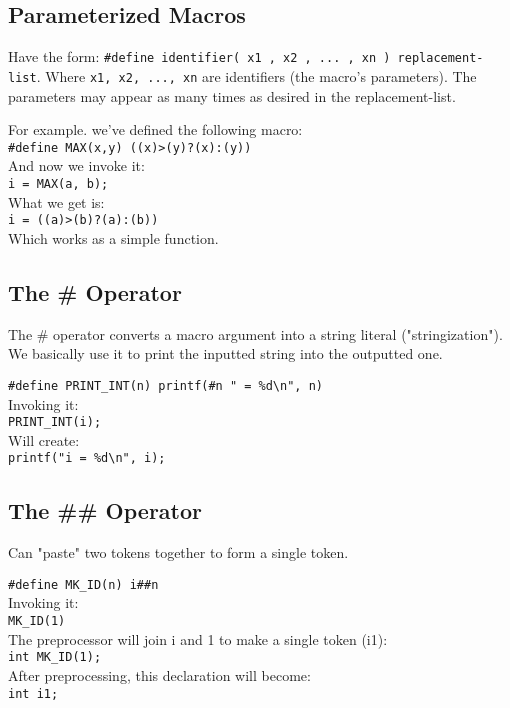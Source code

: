 \documentclass[openany]{book}
\begin{document}
    \subsection*{Parameterized Macros}

    Have the form: \texttt{\#define identifier( x1 , x2 , ... , xn ) replacement-list}. Where \texttt{x1, x2, ..., xn} are identifiers (the macro's parameters). The parameters may appear as many times as desired in the replacement-list.
    
    \bigskip

    For example. we've defined the following macro: \\
    \texttt{\#define MAX(x,y) ((x)>(y)?(x):(y))} \\
    And now we invoke it: \\
    \texttt{i = MAX(a, b);} \\
    What we get is: \\
    \texttt{i = ((a)>(b)?(a):(b))} \\
    Which works as a simple function.

    \subsection*{The \# Operator}

    The \# operator converts a macro argument into a string literal ("stringization"). We basically use it to print the inputted string into the outputted one.

    \bigskip

    \texttt{\#define PRINT\_INT(n) printf(\#n " = \%d\textbackslash n", n)} \\
    Invoking it: \\
    \texttt{PRINT\_INT(i);} \\
    Will create: \\
    \texttt{printf("i = \%d\textbackslash n", i);}

    \subsection*{The \#\# Operator}

    Can "paste" two tokens together to form a single token.

    \bigskip

    \texttt{\#define MK\_ID(n) i\#\#n} \\
    Invoking it: \\
    \texttt{MK\_ID(1)}\\
    The preprocessor will join i and 1 to make a single token (i1): \\
    \texttt{int MK\_ID(1);} \\
    After preprocessing, this declaration will become: \\
    \texttt{int i1;} \\
    
\end{document}
